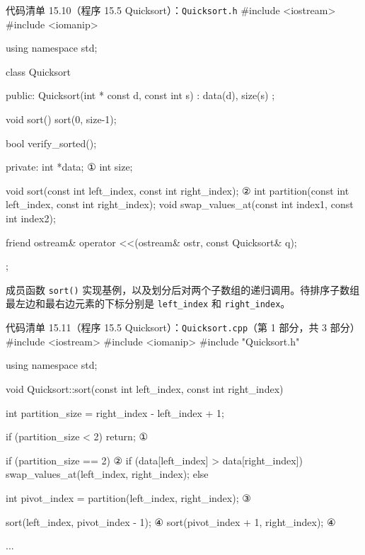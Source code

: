 \begin{codeboxt}{代码清单 15.10（程序 15.5 Quicksort）：\texttt{Quicksort.\allowbreak{}h}}
#include <iostream>
#include <iomanip>

using namespace std;

class Quicksort
{
public:
    Quicksort(int * const d, const int s) : data(d), size(s) {};

    void sort() { sort(0, size-1); }

    bool verify_sorted();

private:
    int *data;                                                 ①
    int size;

    void sort(const int left_index, const int right_index);    ②
    int partition(const int left_index, const int right_index);
    void swap_values_at(const int index1, const int index2);

    friend ostream& operator <<(ostream& ostr, const Quicksort& q);
};
\end{codeboxt}
\par
{}\par

成员函数 \texttt{sort()} 实现基例，以及划分后对两个子数组的递归调用。待排序子数组最左边和最右边元素的下标分别是 \texttt{left\_\allowbreak{}index} 和 \texttt{right\_\allowbreak{}index}。

\begin{codeboxt}{代码清单 15.11（程序 15.5 Quicksort）：\texttt{Quicksort.\allowbreak{}cpp}（第 1 部分，共 3 部分）}
#include <iostream>
#include <iomanip>
#include "Quicksort.h"

using namespace std;

void Quicksort::sort(const int left_index, const int right_index)
{
    int partition_size = right_index - left_index + 1;

    if (partition_size < 2) return;                              ①

    if (partition_size == 2)                                     ②
    {
        if (data[left_index] > data[right_index])
        {
            swap_values_at(left_index, right_index);
        }
    }
    else
    {
        int pivot_index = partition(left_index, right_index);    ③

        sort(left_index, pivot_index - 1);                       ④
        sort(pivot_index + 1, right_index);                      ④
    }
}

...
\end{codeboxt}
\par
{}\par
{}\par
{}\par

